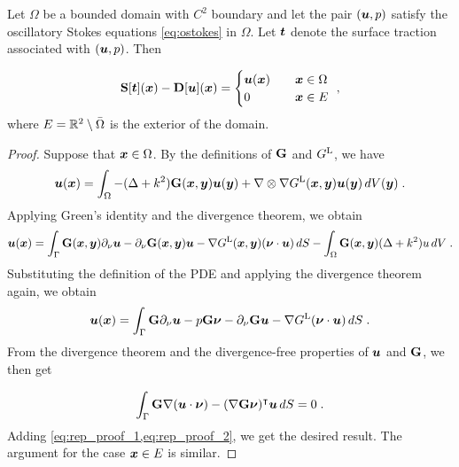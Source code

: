 \begin{thrm} \label{thrm:rep-theorem}
  Let $\Omega$ be a bounded domain with $C^2$ boundary and let
  the pair $({\boldsymbol u},p)$ satisfy the oscillatory Stokes equations
  \cref{eq:ostokes} in $\Omega$. Let ${\boldsymbol t}$ denote the surface
  traction associated with $({\boldsymbol u},p)$. Then

  \begin{equation} \label{eq:rep-theorem}
    {\bf S} [{\boldsymbol t}]({\boldsymbol x}) - {\bf D}[{\boldsymbol u}]({\boldsymbol x}) = \begin{cases} 
    {\boldsymbol u}({\boldsymbol x}) &\quad {\boldsymbol x} \in \Omega \,  \\
    0 &\quad {\boldsymbol x} \in E 
    \end{cases} \; ,
  \end{equation}
  where $E=\mathbb{R}^2\setminus\bar\Omega$ is the
  exterior of the domain.
\end{thrm}

\begin{proof}
  Suppose that ${\boldsymbol x} \in \Omega$.
  By the definitions of ${\bf G}$ and $G^{\textrm{L}}$, we have
  \begin{equation*}
    {\boldsymbol u}({\boldsymbol x}) = \int_\Omega -(\Delta + k^2) {\bf G}({\boldsymbol x},{\boldsymbol y}) {\boldsymbol u}({\boldsymbol y})
    + \nabla \otimes \nabla G^{\textrm{L}}({\boldsymbol x},{\boldsymbol y}) {\boldsymbol u}({\boldsymbol y}) \, dV({\boldsymbol y}) \; .
  \end{equation*}
  Applying Green's identity and the divergence theorem, we
  obtain
  \begin{equation}
    {\boldsymbol u}({\boldsymbol x}) = \int_\Gamma {\bf G}({\boldsymbol x},{\boldsymbol y}) \partial_\nu {\boldsymbol u}
    - \partial_\nu {\bf G}({\boldsymbol x},{\boldsymbol y}) {\boldsymbol u}
    - \nabla G^{\textrm{L}}({\boldsymbol x},{\boldsymbol y}) ({\boldsymbol \nu} \cdot {\boldsymbol u}) \, dS 
    - \int_\Omega {\bf G}({\boldsymbol x},{\boldsymbol y}) (\Delta + k^2) u \, dV \; .
    \nonumber
  \end{equation}
  Substituting the definition of the PDE and applying the divergence
  theorem again, we obtain
  \begin{equation}
    {\boldsymbol u}({\boldsymbol x}) = \int_\Gamma {\bf G} \partial_\nu {\boldsymbol u} - p {\bf G} {\boldsymbol \nu} - \partial_\nu {\bf G} {\boldsymbol u}
    - \nabla G^{\textrm{L}} ({\boldsymbol \nu} \cdot {\boldsymbol u}) \, dS  \; . \label{eq:rep_proof_1}
  \end{equation}
  From the divergence theorem and the divergence-free properties of
  ${\boldsymbol u}$ and ${\bf G}$, we then get

  \begin{equation}
    \int_\Gamma {\bf G} \nabla ({\boldsymbol u} \cdot {\boldsymbol \nu})
    - (\nabla {\bf G} {\boldsymbol \nu})^\intercal {\boldsymbol u} \, dS = 0 \; .  \label{eq:rep_proof_2}
  \end{equation}
  Adding \cref{eq:rep_proof_1,eq:rep_proof_2}, we get the desired
  result. The argument for the case ${\boldsymbol x} \in E$ is similar.
\end{proof}

